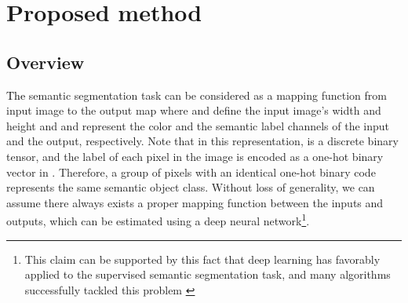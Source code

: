 \documentclass[letterpaper, 10 pt, journal, twoside]{IEEEtran}
\newcommand{\revised}{\textcolor{black}}{}
\begin{document}
\section{Proposed method} \label{sec:PrMe}
\subsection{Overview}
\revised{The} semantic segmentation task can be considered as a mapping function  from input image  to the output map  where  and  define the input image's width and height and  and  represent the color and the semantic label channels of the input and the output, respectively. Note that in this representation,  is a discrete binary tensor, and the label of each pixel in the image  is encoded as a one-hot binary vector in . Therefore, a group of pixels with an identical one-hot binary code represents the same semantic object class. Without loss of generality, we can assume there always exists a proper mapping function between the inputs and outputs, which can be estimated using a deep neural network\footnote{ This claim can be supported by this fact that deep learning has favorably applied to the supervised semantic segmentation task, and many algorithms successfully tackled this problem \cite{DeepLab, RefineNet, PSPNet, FCN}}. \par
\end{document}
